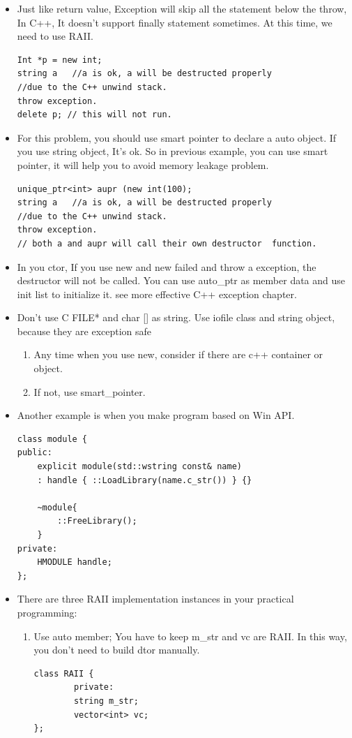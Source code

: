\documentclass[a4paper,11pt,twoside]{book}
\begin{document}
\begin{itemize}
	\item Just like return value,  Exception will skip all the statement below the throw, In C++, It doesn't support finally statement sometimes. At this time, we need to use RAII.
\begin{lstlisting}[numbers=none]
Int *p = new int;
string a   //a is ok, a will be destructed properly
//due to the C++ unwind stack.
throw exception.
delete p; // this will not run.
\end{lstlisting}
	
	\item For this problem, you should use smart pointer to declare a auto object.  If you use string object, It's ok.  So in previous example,  you can use smart pointer, it will help you to avoid memory leakage problem.
\begin{lstlisting}[numbers=none]
unique_ptr<int> aupr (new int(100);
string a   //a is ok, a will be destructed properly
//due to the C++ unwind stack.
throw exception.
// both a and aupr will call their own destructor  function.
\end{lstlisting}
	
	\item In you ctor, If you use new and new failed and throw a exception, the destructor will not be called. You can use auto\_ptr as member data and use init list to initialize it. see  more effective C++ exception chapter.
	
	\item Don't use C FILE* and char [] as string. Use iofile class and string object, because they are exception safe
	\begin{enumerate}
		\item Any time when you use new, consider if there are c++ container or object.
		\item If not, use smart\_pointer.
	\end{enumerate}
	
	\item Another example is when you make program based on Win API.
\begin{lstlisting}[numbers=none]
class module {
public:
	explicit module(std::wstring const& name)
	: handle { ::LoadLibrary(name.c_str()) } {}
	
	~module{
		::FreeLibrary();
	}
private:
	HMODULE handle;
};
\end{lstlisting}
	
	\item There are three RAII implementation instances in your practical programming:
	\begin{enumerate}
		\item Use auto member; You have to keep m\_str and vc are RAII.  In this way, you don't need to build dtor manually.
\begin{lstlisting}[numbers=none]
class RAII {
		private:
		string m_str;
		vector<int> vc;
};
\end{lstlisting}
		

\end{enumerate}
\end{itemize}
\end{document}
